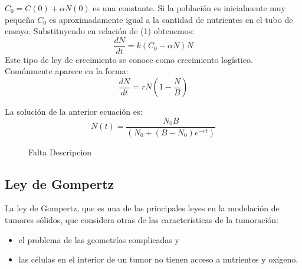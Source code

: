$C_{0} = C(0) + \alpha N(0)$ es una constante. Si la población es inicialmente muy pequeña $C_{0}$ es aproximadamente igual a la cantidad de nutrientes en el tubo de ensayo. Substituyendo en relaci\'on de (1) obtenemos:
\begin{equation}
    \frac{dN}{dt} = k(C_{0} - \alpha N)N
\end{equation}
Este tipo de ley de crecimiento se conoce como crecimiento logístico. Comúnmente aparece en la forma:
\begin{equation}
    \frac{dN}{dt} = rN(1 - \frac{N}{B})
\end{equation}

La soluci\'on de la anterior ecuaci\'on es:
\begin{equation}
    N(t) = \frac{N_{0}B}{(N_{0} + (B - N_{0})e^{-rt})}
\end{equation}
\begin{figure}[!ht]
\begin{center}
\end{center}\vspace*{-0.6cm}
\caption[Imagen de Oncogenes. Falta poner leyenda]{Falta Descripcion}
\label{fig-logistico}
\end{figure}

\subsection{Ley de Gompertz}
La ley de Gompertz, que es una de las principales leyes en la modelación de tumores sólidos, que considera otras de las características de la tumoración:
\begin{itemize}
    \item el problema de las geometrías complicadas y
    \item las células en el interior de un tumor no tienen acceso a nutrientes y oxígeno.
\end{itemize}

